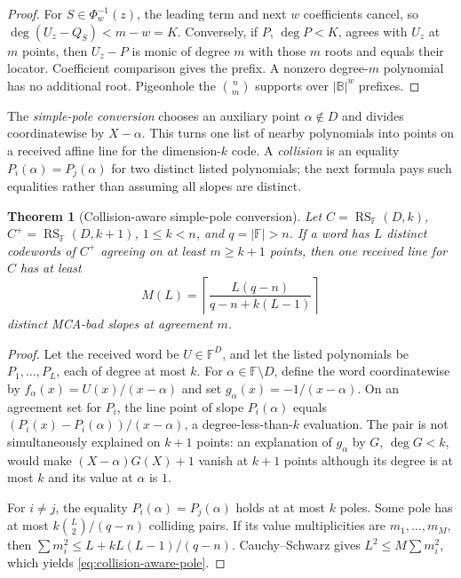\documentclass[11pt,a4paper]{amsart}
\numberwithin{equation}{section}
\newtheorem{theorem}{Theorem}[section]
\theoremstyle{remark}
\DeclareMathOperator{\RS}{RS}
\newcommand{\F}{\mathbb F}
\newcommand{\B}{\mathbb B}
\newcommand{\abs}[1]{\lvert #1\rvert}
\begin{document}
\begin{proof}
For \(S\in\Phi_w^{-1}(z)\), the leading term and next \(w\) coefficients
cancel, so \(\deg(U_z-Q_S)<m-w=K\).  Conversely, if \(P\), \(\deg P<K\),
agrees with \(U_z\) at \(m\) points, then \(U_z-P\) is monic of degree
\(m\) with those \(m\) roots and equals their locator.  Coefficient
comparison gives the prefix.  A nonzero degree-\(m\) polynomial has no
additional root.  Pigeonhole the \(\binom nm\) supports over
\(\abs\B^w\) prefixes.
\end{proof}

The \emph{simple-pole conversion} chooses an auxiliary point
\(\alpha\notin D\) and divides coordinatewise by \(X-\alpha\).  This
turns one list of nearby polynomials into points on a received affine line
for the dimension-\(k\) code.  A \emph{collision} is an equality
\(P_i(\alpha)=P_j(\alpha)\) for two distinct listed polynomials; the next
formula pays such equalities rather than assuming all slopes are distinct.

\begin{theorem}[Collision-aware simple-pole conversion]
\label{thm:collision-aware-pole}
Let \(C=\RS_\F(D,k)\), \(C^+=\RS_\F(D,k+1)\), \(1\le k<n\), and
\(q=\abs\F>n\).  If a word has \(L\) distinct codewords of \(C^+\)
agreeing on at least \(m\ge k+1\) points, then one received line for \(C\)
has at least
\[
 M(L)=\left\lceil
 \frac{L(q-n)}{q-n+k(L-1)}
 \right\rceil
 \tag{4.2}\label{eq:collision-aware-pole}
\]
distinct MCA-bad slopes at agreement \(m\).
\end{theorem}

\begin{proof}
Let the received word be \(U\in\F^D\), and let the listed polynomials be
\(P_1,\ldots,P_L\), each of degree at most \(k\).  For
\(\alpha\in\F\setminus D\), define the word coordinatewise by
\(f_\alpha(x)=U(x)/(x-\alpha)\) and set
\(g_\alpha(x)=-1/(x-\alpha)\).  On an agreement set for \(P_i\), the line
point of slope \(P_i(\alpha)\) equals
\((P_i(x)-P_i(\alpha))/(x-\alpha)\), a degree-less-than-\(k\) evaluation.
The pair is not simultaneously explained on \(k+1\) points: an explanation
of \(g_\alpha\) by \(G\), \(\deg G<k\), would make
\((X-\alpha)G(X)+1\) vanish at \(k+1\) points although its degree is at
most \(k\) and its value at \(\alpha\) is \(1\).

For \(i\ne j\), the equality \(P_i(\alpha)=P_j(\alpha)\) holds at at most
\(k\) poles.  Some pole has at most \(k\binom L2/(q-n)\) colliding pairs.
If its value multiplicities are \(m_1,\ldots,m_M\), then
\(\sum m_i^2\le L+kL(L-1)/(q-n)\).  Cauchy--Schwarz gives
\(L^2\le M\sum m_i^2\), which yields \eqref{eq:collision-aware-pole}.
\end{proof}
\end{document}

